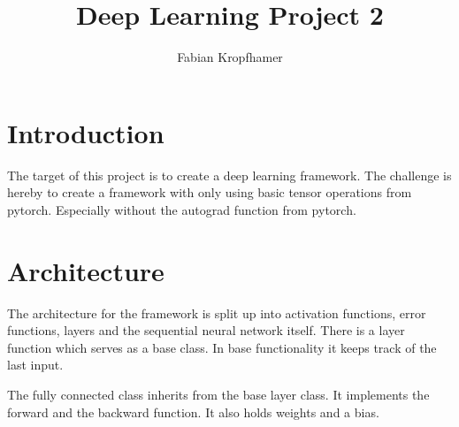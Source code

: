 \documentclass[12pt]{article}
\title{
	Deep Learning Project 2
}
\author{Fabian Kropfhamer}
\begin{document}
\maketitle


\section{Introduction}
The target of this project is to create a deep learning framework.
The challenge is hereby to create a framework with only using basic tensor operations from pytorch.
Especially without the autograd function from pytorch.


\section{Architecture}
The architecture for the framework is split up into activation functions, error functions, layers and the sequential neural network itself.
There is a layer function which serves as a base class.
In base functionality it keeps track of the last input.

The fully connected class inherits from the base layer class.
It implements the forward and the backward function.
It also holds weights and a bias.
\end{document}

